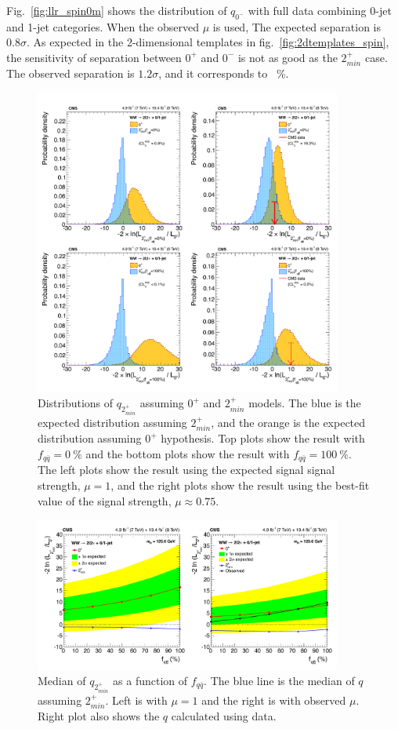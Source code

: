 Fig.~\ref{fig:llr_spin0m} shows the distribution of $q_{0^-}$ with full data 
combining 0-jet and 1-jet categories. When the observed $\mu$ is used, 
The expected separation is $0.8\sigma$.  
As expected in the 2-dimensional templates in fig.~\ref{fig:2dtemplates_spin},
the sensitivity of separation between $0^+$ and $0^-$ is 
not as good as the $2_{min}^+$ case.
The observed separation is $1.2\sigma$, and it corresponds to ~\%. 

%
\begin{figure}[ht!] 
\centering 
\includegraphics[width=0.9\textwidth]{figures/spin2LLR.pdf}
\caption{Distributions of $q_{2_{min}^+}$ assuming $0^+$ and $2_{min}^+$ models.  
The blue is the expected distribution assuming 
$2_{min}^+$, and the orange is the expected distribution assuming $0^+$ hypothesis.
Top plots show the result with $f_{q\bar{q}}=0~\%$ and the bottom plots show 
the result with $f_{q\bar{q}}=100~\%$. The left plots show the result using the 
expected signal signal strength, $\mu=1$, 
and the right plots show the result using the best-fit value of the signal strength, 
$\mu \approx 0.75$.}  
\label{fig:llr_spin2} 
\end{figure} 
%
\begin{figure}[ht!] 
\centering 
\includegraphics[width=0.9\textwidth]{figures/spinLLRband.pdf}
\caption{Median of $q_{2_{min}^+}$ as a function of $f_{q\bar{q}}$. 
The blue line is the median of $q$ assuming $2_{min}^+$.
Left is with $\mu=1$ and the right is with observed $\mu$.
Right plot also shows the $q$ calculated using data. 
} 
\label{fig:llr_band} 
\end{figure} 
